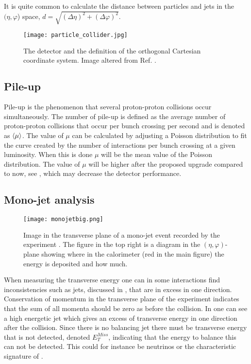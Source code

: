 It is quite common to calculate the distance between particles and jets in the $(\eta,\varphi$) space, $d=\sqrt{(\Delta \eta)^2 + (\Delta \varphi)^2}$. 

\begin{figure}[ht]
\begin{center}
\texttt{[image: particle\_collider.jpg]}
\caption{The \abbrATLAS detector and the definition of the orthogonal Cartesian coordinate system. Image altered from Ref. \citep{coordimage}.}
\label{fig:coordinatesystem}
\end{center}
\end{figure}

\subsection{Pile-up}\label{sec:eo:subsec:pile}

Pile-up is the phenomenon that several proton-proton collisions occur simultaneously. The number of pile-up is defined as the average number of proton-proton collisions that occur per bunch crossing per second and is denoted as $\left<\mu\right>$. The value of $\mu$ can be calculated by adjusting a Poisson distribution to fit the curve created by the number of interactions per bunch crossing at a given luminosity. When this is done $\mu$ will be the mean value of the Poisson distribution. The value of $\mu$ will be higher after the proposed upgrade compared to now, see , which may decrease the detector performance.

\subsection{Mono-jet analysis}\label{sec:eo:subsec:mjet}

\begin{figure}[ht]
\texttt{[image: monojetbig.png]}
\caption{Image in the transverse plane of a mono-jet event recorded by the \abbrATLAS experiment \citep{monojet}. The figure in the top right is a diagram in the $(\eta,\varphi)$-plane showing where in the calorimeter (red in the main figure) the energy is deposited and how much.}
\label{fig:monojet}
\end{figure}

When measuring the transverse energy one can in some interactions find inconsistencies such as jets, discussed in , that are in excess in one direction. Conservation of momentum in the transverse plane of the experiment indicates that the sum of all momenta should be zero as before the collision. In  one can see a high energetic jet which gives an excess of transverse energy in one direction after the collision. Since there is no balancing jet there must be transverse energy that is not detected, denoted $E_T^{Miss}$, indicating that the energy to balance this can not be detected. This could for instance be neutrinos or the characteristic signature of \abbrWIMPS .

